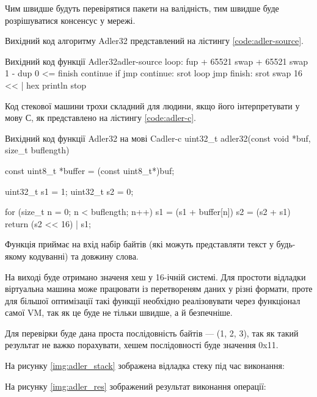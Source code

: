 \documentclass{lib/styles/default-style}
\begin{document}
    Чим швидше будуть перевірятися пакети на валідність, тим швидше буде розрішуватися консенсус у мережі.

    Вихідний код алгоритму Adler32 представлений на лістингу \ref{code:adler-source}.

    \begin{stdout}{Вихідний код функції Adler32}{adler-source}
        loop:
        fup
        + 65521 swap
        + 65521 swap
        1 - dup 0
        <= finish continue if jmp
    continue:
        srot
        loop jmp
    finish:
        srot swap
        16 << |
        hex println
        stop\end{stdout}

    Код стекової машини трохи складний для людини, якщо його інтерпретувати у мову С, як представлено на лістингу \ref{code:adler-c}.

    \begin{stdout}{Вихідний код функції Adler32 на мові C}{adler-c}
        uint32_t adler32(const void *buf,
                         size_t buflength) {
            const uint8_t *buffer = (const uint8_t*)buf;

            uint32_t s1 = 1;
            uint32_t s2 = 0;

            for (size_t n = 0; n < buflength; n++) {
                s1 = (s1 + buffer[n]) %
                s2 = (s2 + s1) %
            }     
            return (s2 << 16) | s1;
        }\end{stdout}

    Функція приймає на вхід набір байтів (які можуть представляти текст у будь-якому кодуванні) та довжину слова.
    
    На виході буде отримано значеня хеш у 16-ічній системі. Для простоти відладки віртуальна машина
    може працювати із перетвореням даних у різні формати, проте для більшої оптимізації такі функції необхідно реалізовувати
    через функціонал самої VM, так як це буде не тільки швидше, а й безпечніше.

    Для перевірки буде дана проста послідовність байтів --- (1, 2, 3), так як такий результат не важко порахувати,
    хешем послідовності буде значення 0x11.

    На рисунку \ref{img:adler_stack} зображена відладка стеку під час виконання:

    
    На рисунку \ref{img:adler_res} зображений результат виконання операції:
\end{document}
